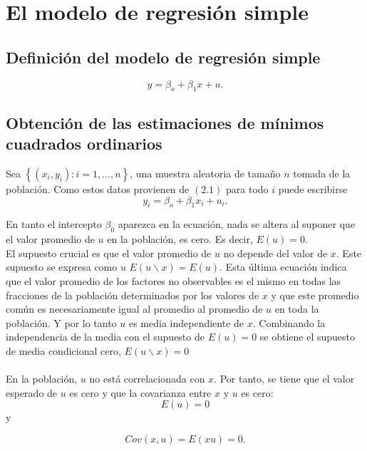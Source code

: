 \setcounter{chapter}{1}
\chapter{El modelo de regresión simple}
\section{Definición del modelo de regresión simple}
\begin{equation}
    y = \beta_o + \beta_1x + u.
\end{equation}

\section{Obtención de las estimaciones de mínimos cuadrados ordinarios}

Sea $\left\{(x_i,y_i): i = 1,\ldots,n\right\}$, una muestra aleatoria de tamaño $n$ tomada de la población. Como estos datos provienen de $(2.1)$ para todo $i$ puede escribirse 
\begin{equation}
    y_i = \beta_o + \beta_1x_i + u_i.
\end{equation}

En tanto el intercepto $\beta_0$ aparezca en la ecuación, nada se altera al suponer que el valor promedio de $u$ en la población, es cero. Es decir, $E(u)=0$.\\
El supuesto crucial es que el valor promedio de $u$ no depende del valor de $x$. Este supuesto se expresa como $u$ $E(u\backslash x) = E(u)$. Esta última ecuación indica que el valor promedio de los factores no observables es el mismo en todas las fracciones de la población determinados por los valores de $x$ y que este promedio común es necesariamente igual al promedio al promedio de $u$ en toda la población. Y por lo tanto $u$ es media independiente de $x$. Combinando la independencia de la media con el supuesto de $E(u)=0$ se obtiene el supuesto de media condicional cero, $E(u\backslash x) = 0$\\\\

En la población, $u$ no está correlacionada con $x$. Por tanto, se tiene que el valor esperado de $u$ es cero y que la covarianza entre $x$ y $u$ es cero:
\begin{equation}
    E(u)=0
\end{equation}
 y 

\begin{equation}
    Cov(x,u) = E(xu) =0.
\end{equation}

